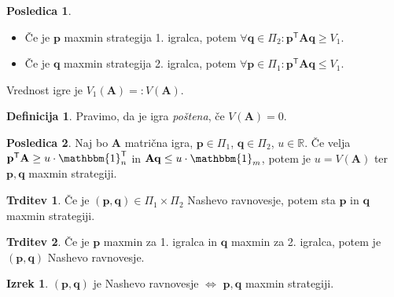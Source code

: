 \documentclass[11pt]{article}
\newcommand{\R}{\mathbb{R}}
\newcommand{\T}{\textsf{T}}
\newcommand{\p}{\mathbf{p}}
\newcommand{\q}{\mathbf{q}}
\renewcommand{\AA}{\mathbf{A}}
\newcommand{\1}{\mathbbm{1}}
\theoremstyle{definition}
\newtheorem{definicija}{Definicija}[section]
\theoremstyle{definition}
\newtheorem{trditev}{Trditev}[section]
\theoremstyle{definition}
\newtheorem{izrek}{Izrek}[section]
\theoremstyle{definition}
\newtheorem*{posledica}{Posledica}
\begin{document}
\begin{posledica}
~
\begin{itemize}
	\item Če je $\p$ maxmin strategija 1. igralca, potem $\forall \q\in\Pi_2: \p^\T\AA\q \geq V_1$.
	\item Če je $\q$ maxmin strategija 2. igralca, potem $\forall \p\in\Pi_1: \p^\T\AA\q \leq V_1$. 
\end{itemize}
Vrednost igre je $V_1(\AA) =: V(\AA)$.

\end{posledica}
\vspace{0.5cm}

\begin{definicija}

Pravimo, da je igra \textit{poštena}, če $V(\AA)=0$.

\end{definicija}
\vspace{0.5cm}

\begin{posledica}

Naj bo $\AA$ matrična igra, $\p\in\Pi_1$, $\q\in\Pi_2$, $u\in\R$. Če velja $\p^\T\AA \geq u\cdot \1_n^\T$ in $\AA\q \leq u \cdot \1_m$, potem je $u=V(\AA)$ ter $\p,\q$ maxmin strategiji.

\end{posledica}
\vspace{0.5cm}

\begin{trditev}

Če je $(\p,\q)\in\Pi_1\times\Pi_2$ Nashevo ravnovesje, potem sta $\p$ in $\q$ maxmin strategiji.

\end{trditev}
\vspace{0.5cm}

\begin{trditev}

Če je $\p$ maxmin za 1. igralca in $\q$ maxmin za 2. igralca, potem je $(\p,\q)$ Nashevo ravnovesje.

\end{trditev}
\vspace{0.5cm}

\begin{izrek}

$(\p,\q)$ je Nashevo ravnovesje $\iff$ $\p,\q$ maxmin strategiji.

\end{izrek}
\vspace{0.5cm}
\end{document}
